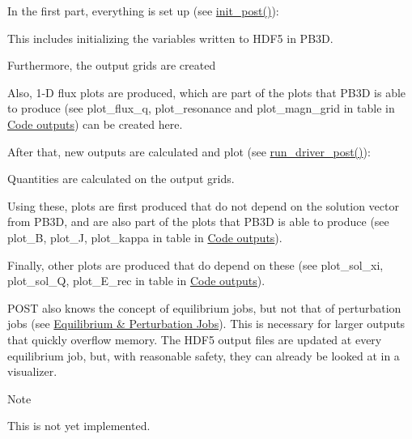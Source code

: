 \begin{DoxyItemize}
\item In the first part, everything is set up (see \hyperlink{namespacedriver__post_af527706d4e696d4e507443d2f74194ef}{init\+\_\+post()})\+:
\begin{DoxyItemize}
\item This includes initializing the variables written to H\+D\+F5 in P\+B3D.
\item Furthermore, the output grids are created
\item Also, 1-\/D flux plots are produced, which are part of the plots that P\+B3D is able to produce (see {\ttfamily plot\+\_\+flux\+\_\+q}, {\ttfamily plot\+\_\+resonance} and {\ttfamily plot\+\_\+magn\+\_\+grid} in table  in \hyperlink{page_outputs}{Code outputs}) can be created here.
\end{DoxyItemize}
\item After that, new outputs are calculated and plot (see \hyperlink{namespacedriver__post_a33b3c6f9018a0ddc92dce77394b8ab37}{run\+\_\+driver\+\_\+post()})\+:
\begin{DoxyItemize}
\item Quantities are calculated on the output grids.
\item Using these, plots are first produced that do not depend on the solution vector from P\+B3D, and are also part of the plots that P\+B3D is able to produce (see {\ttfamily plot\+\_\+B}, {\ttfamily plot\+\_\+J}, {\ttfamily plot\+\_\+kappa} in table  in \hyperlink{page_outputs}{Code outputs}).
\item Finally, other plots are produced that do depend on these (see {\ttfamily plot\+\_\+sol\+\_\+xi}, {\ttfamily plot\+\_\+sol\+\_\+Q}, {\ttfamily plot\+\_\+\+E\+\_\+rec} in table  in \hyperlink{page_outputs}{Code outputs}).
\end{DoxyItemize}
\end{DoxyItemize}

P\+O\+ST also knows the concept of equilibrium jobs, but not that of perturbation jobs (see \hyperlink{page_overview_overview_jobs}{Equilibrium \& Perturbation Jobs}). This is necessary for larger outputs that quickly overflow memory. The H\+D\+F5 output files are updated at every equilibrium job, but, with reasonable safety, they can already be looked at in a visualizer.

\begin{DoxyNote}{Note}

\begin{DoxyEnumerate}
\item \label{page_overview_fng1}%
%
This is not yet implemented. 
\end{DoxyEnumerate}
\end{DoxyNote}
